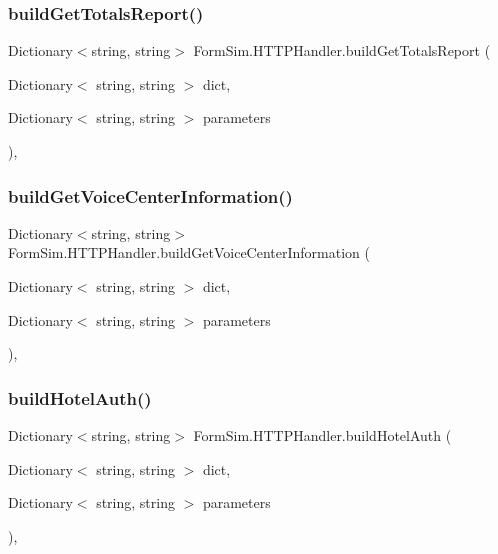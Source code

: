 \subsubsection{\texorpdfstring{build\+Get\+Totals\+Report()}{buildGetTotalsReport()}}
{\footnotesize\ttfamily Dictionary$<$string, string$>$ Form\+Sim.\+H\+T\+T\+P\+Handler.\+build\+Get\+Totals\+Report (\begin{DoxyParamCaption}\item[{Dictionary$<$ string, string $>$}]{dict,  }\item[{Dictionary$<$ string, string $>$}]{parameters }\end{DoxyParamCaption})\hspace{0.3cm}{\ttfamily [inline]}, {\ttfamily [private]}}

\mbox{\label{class_form_sim_1_1_h_t_t_p_handler_af9078923d0db307f20ac054594cbcaee}} 
\subsubsection{\texorpdfstring{build\+Get\+Voice\+Center\+Information()}{buildGetVoiceCenterInformation()}}
{\footnotesize\ttfamily Dictionary$<$string, string$>$ Form\+Sim.\+H\+T\+T\+P\+Handler.\+build\+Get\+Voice\+Center\+Information (\begin{DoxyParamCaption}\item[{Dictionary$<$ string, string $>$}]{dict,  }\item[{Dictionary$<$ string, string $>$}]{parameters }\end{DoxyParamCaption})\hspace{0.3cm}{\ttfamily [inline]}, {\ttfamily [private]}}

\mbox{\label{class_form_sim_1_1_h_t_t_p_handler_a0e271753990736b71c2194688e1f55f8}} 
\subsubsection{\texorpdfstring{build\+Hotel\+Auth()}{buildHotelAuth()}}
{\footnotesize\ttfamily Dictionary$<$string, string$>$ Form\+Sim.\+H\+T\+T\+P\+Handler.\+build\+Hotel\+Auth (\begin{DoxyParamCaption}\item[{Dictionary$<$ string, string $>$}]{dict,  }\item[{Dictionary$<$ string, string $>$}]{parameters }\end{DoxyParamCaption})\hspace{0.3cm}{\ttfamily [inline]}, {\ttfamily [private]}}

